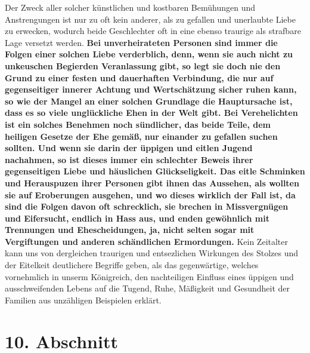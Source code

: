 Der Zweck aller solcher künstlichen und kostbaren Bemühungen und Anstrengungen
ist nur zu oft kein anderer, als zu gefallen und unerlaubte Liebe zu erwecken,
wodurch beide Geschlechter oft in eine ebenso traurige als strafbare Lage
versetzt werden. 
\label{ref:11_09_kaputte_ehen} \textbf{Bei
unverheirateten Personen sind immer die Folgen einer
solchen Liebe verderblich, denn, wenn sie auch nicht zu unkeuschen Begierden
Veranlassung gibt, so legt sie doch nie den Grund zu einer festen und
dauerhaften Verbindung, die nur auf gegenseitiger innerer Achtung und
Wertschätzung sicher ruhen kann, so wie der Mangel an einer solchen Grundlage
die Hauptursache ist, dass es so viele unglückliche Ehen in der Welt gibt. Bei
Verehelichten ist ein solches Benehmen noch sündlicher, das beide Teile, dem
heiligen Gesetze der Ehe gemäß, nur einander zu gefallen suchen sollten. Und
wenn sie darin der üppigen und eitlen Jugend nachahmen, so ist dieses immer ein
schlechter Beweis ihrer gegenseitigen Liebe und häuslichen Glückseligkeit. Das
eitle Schminken und Herauspuzen ihrer Personen gibt ihnen das Aussehen, als
wollten sie auf Eroberungen ausgehen, und wo dieses wirklich der Fall ist, da
sind die Folgen davon oft schrecklich, sie brechen in Missvergnügen und
Eifersucht, endlich in Hass aus, und enden gewöhnlich mit Trennungen und
Ehescheidungen, ja, nicht selten sogar mit Vergiftungen und anderen schändlichen
Ermordungen.} Kein Zeitalter kann uns von dergleichen traurigen und entsezlichen
Wirkungen des Stolzes und der Eitelkeit deutlichere Begriffe geben, als das
gegenwärtige, welches vornehmlich in unserm Königreich, den nachteiligen
Einfluss eines üppigen und ausschweifenden Lebens auf die Tugend, Ruhe, Mäßigkeit
und Gesundheit der Familien aus unzähligen Beispielen erklärt.

\section{10. Abschnitt} \label{kap11_ab10}

